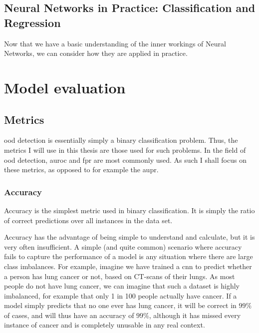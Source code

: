 \documentclass[UKenglish]{uiomasterthesis} %
\theoremstyle{definition}
\begin{document}
\subsection{Neural Networks in Practice: Classification and Regression}

Now that we have a basic understanding of the inner workings of Neural Networks, we can consider how they are applied in practice.

\section{Model evaluation}

\subsection{Metrics}

\ac{ood} detection is essentially simply a binary classification problem. Thus, the metrics I will use in this thesis are those used for such problems. In the field of \ac{ood} detection, \ac{auroc} and \ac{fpr} are most commonly used. As such I shall focus on these metrics, as opposed to for example the \ac{aupr}.

\subsubsection{Accuracy}

Accuracy is the simplest metric used in binary classification. It is simply the ratio of correct predictions over all instances in the data set. %


Accuracy has the advantage of being simple to understand and calculate, but it is very often insufficient. A simple (and quite common) scenario where accuracy fails to capture the performance of a model is any situation where there are large class imbalances. For example, imagine we have trained a \ac{cnn} to predict whether a person has lung cancer or not, based on CT-scans of their lungs. As most people do not have lung cancer, we can imagine that such a dataset is highly imbalanced, for example that only 1 in 100 people actually have cancer. If a model simply predicts that no one ever has lung cancer, it will be correct in $99\%$ of cases, and will thus have an accuracy of $99\%$, although it has missed every instance of cancer and is completely unusable in any real context.
\end{document}
